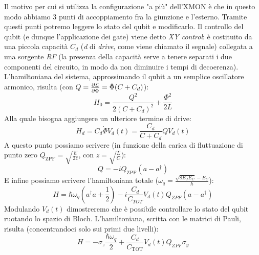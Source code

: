 Il motivo per cui si utilizza la configurazione "a più" dell'XMON è che in questo modo abbiamo 3 punti di accoppiamento fra la giunzione e l'esterno. Tramite questi punti potremo leggere lo stato del qubit e modificarlo.
Il controllo del qubit (e dunque l'applicazione dei gate) viene detto \textit{XY control}: è costituito da una piccola capacità $C_d$ (\textit{d} di \textit{drive}, come viene chiamato il segnale) collegata a una sorgente \textit{RF} (la presenza della capacità serve a tenere separati i due componenti del circuito, in modo da non diminuire i tempi di decoerenza).
L'hamiltoniana del sistema, approssimando il qubit a un semplice oscillatore armonico, risulta (con $Q=\partialderivative{\mathcal L}{\dot{\Phi}}=\dot{\Phi}(C+C_d)$):
\begin{equation*}
    H_0 = \frac{Q^2}{2(C+C_d)^2} +\frac{\Phi^2}{2L}
\end{equation*}
Alla quale bisogna aggiungere un ulteriore termine di drive:
\begin{equation*}
    H_d = C_d \dot \Phi V_d(t)=\frac{C_d}{C+C_d}QV_d(t)
\end{equation*}
A questo punto possiamo scrivere (in funzione della carica di fluttuazione di punto zero $Q_{\text{ZPF}}=\sqrt{\frac{\hbar}{2z}}$, con $z=\sqrt{\frac{L}{C}}$):
\begin{equation*}
    Q= -i Q_{\text{ZPF}}(a - a^\dagger)
\end{equation*}
E infine possiamo scrivere l'hamiltoniana totale ($\omega_q=\frac{\sqrt{8E_JE_C}-E_C}{\hbar}$):
\begin{equation*}
    H = \hbar \omega_q \left(a^\dagger a + \frac{1}{2}\right)- i\frac{C_d}{C_{TOT}}V_d(t)Q_{ZPF}(a-a^\dagger)
\end{equation*}
Modulando $V_d(t)$ dimostreremo che è possibile controllare lo stato del qubit ruotando lo spazio di Bloch.
L'hamiltoniana, scritta con le matrici di Pauli, risulta (concentrandoci solo sui primi due livelli):
\begin{equation*}
    H = - \sigma_z\frac{\hbar\omega_q}{2}+\frac{C_d}{C_{\text{TOT}}}V_d(t)Q_{ZPF}\sigma_y
\end{equation*}

